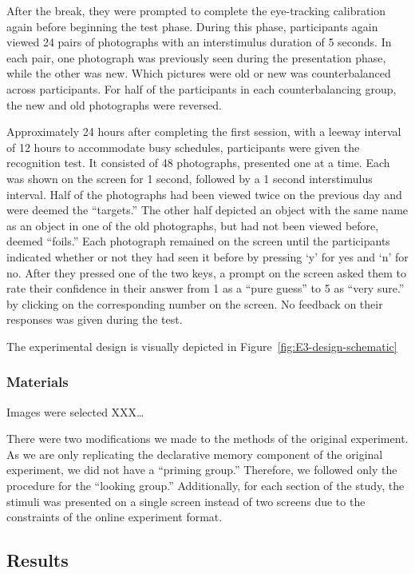 \documentclass[
  man,floatsintext]{apa6}
\begin{document}
After the break, they were prompted to complete the eye-tracking
calibration again before beginning the test phase. During this phase,
participants again viewed 24 pairs of photographs with an interstimulus
duration of 5 seconds. In each pair, one photograph was previously seen
during the presentation phase, while the other was new. Which pictures
were old or new was counterbalanced across participants.
For half of the participants in each counterbalancing group, the new and
old photographs were
reversed.

Approximately 24 hours after completing the first session, with a leeway
interval of 12 hours to accommodate busy schedules, participants were
given the recognition test. It consisted of 48 photographs, presented
one at a time. Each was shown on the screen for 1 second, followed by a
1 second interstimulus interval. Half of the photographs had been
viewed twice on the previous day and were deemed the ``targets.'' The
other half depicted an object with the same name as an object in one of
the old photographs, but had not been viewed before, deemed ``foils.''
Each photograph remained on the screen until the participants indicated
whether or not they had seen it before by pressing `y' for yes and `n'
for no. After they pressed one of the two keys, a prompt on the screen
asked them to rate their confidence in their answer from 1 as a ``pure
guess'' to 5 as ``very sure.'' by clicking on the corresponding number on
the screen. No feedback on their responses was given during the test.

The experimental design is visually depicted in Figure~\ref{fig:E3-design-schematic}

\hypertarget{materials}{%
\subsubsection{Materials}\label{materials}}

Images were selected XXX\ldots{}

There were two modifications we made to the methods of the original
experiment. As we are only replicating the declarative memory component
of the original experiment, we did not have a ``priming group.''
Therefore, we followed only the procedure for the ``looking group.''
Additionally, for each section of the study, the stimuli was presented
on a single screen instead of two screens due to the constraints of the
online experiment format.

\hypertarget{results-2}{%
\subsection{Results}\label{results-2}}
\end{document}
